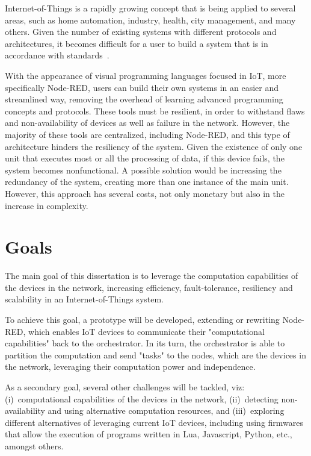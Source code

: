 Internet-of-Things is a rapidly growing concept that is being applied to several areas, such as home automation, industry, health, city management, and many others. Given the number of existing systems with different protocols and architectures, it becomes difficult for a user to build a system that is in accordance with standards~\cite{standard-iot}. 

With the appearance of visual programming languages focused in IoT, more specifically Node-RED, users can build their own systems in an easier and streamlined way, removing the overhead of learning advanced programming concepts and protocols. These tools must be resilient, in order to withstand flaws and non-availability of devices as well as failure in the network. However, the majority of these tools are centralized, including Node-RED, and this type of architecture hinders the resiliency of the system. Given the existence of only one unit that executes most or all the processing of data, if this device fails, the system becomes nonfunctional. A possible solution would be increasing the redundancy of the system, creating more than one instance of the main unit. However, this approach has several costs, not only monetary but also in the increase in complexity.

\section{Goals} \label{sec:goals}

The main goal of this dissertation is to leverage the computation capabilities of the devices in the network, increasing efficiency, fault-tolerance, resiliency and scalability in an Internet-of-Things system.

To achieve this goal, a prototype will be developed, extending or rewriting Node-RED, which enables IoT devices to communicate their "computational capabilities" back to the orchestrator. In its turn, the orchestrator is able to partition the computation and send "tasks" to the nodes, which are the devices in the network, leveraging their computation power and independence.

As a secondary goal, several other challenges will be tackled, viz: (i)~computational capabilities of the devices in the network, (ii)~detecting non-availability and using alternative computation resources, and (iii)~exploring different alternatives of leveraging current IoT devices, including using firmwares that allow the execution of programs written in Lua, Javascript, Python, etc., amongst others.

